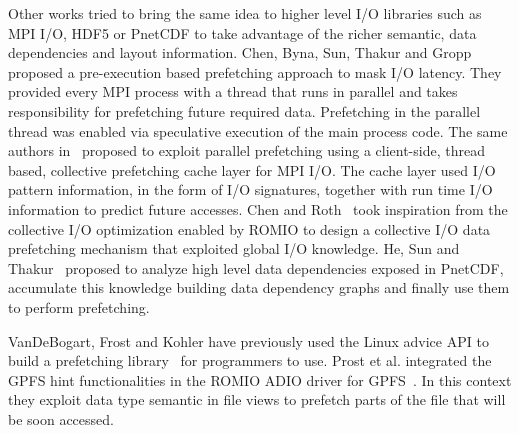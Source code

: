 Other works tried to bring the same idea to higher level I/O libraries such as MPI I/O, HDF5 or PnetCDF to take advantage of the richer semantic, data dependencies and layout information. Chen, Byna, Sun, Thakur and Gropp~\cite{ChenBSTG08} proposed a pre-execution based prefetching approach to mask I/O latency. They provided every MPI process with a thread that runs in parallel and takes responsibility for prefetching future required data. Prefetching in the parallel thread was enabled via speculative execution of the main process code. %
The same authors in~\cite{BynaCST08} proposed to exploit parallel prefetching using a client-side, thread based, collective prefetching cache layer for MPI I/O. The cache layer used I/O pattern information, in the form of I/O signatures, together with run time I/O information to predict future accesses. %
Chen and Roth~\cite{ChenR10} took inspiration from the collective I/O optimization enabled by ROMIO to design a collective I/O data prefetching mechanism that exploited global I/O knowledge. %
He, Sun and Thakur~\cite{HEST12} proposed to analyze high level data dependencies exposed in PnetCDF, accumulate this knowledge building data dependency graphs and finally use them to perform prefetching. 

VanDeBogart, Frost and Kohler have previously used the Linux advice API to build a prefetching library~\cite{VanDeBogartFK09} for programmers to use. Prost et al. integrated the GPFS hint functionalities in the ROMIO ADIO driver for GPFS~\cite{ProstTHJK01}. In this context they exploit data type semantic in file views to prefetch parts of the file that will be soon accessed. 

